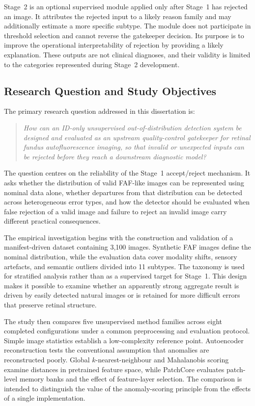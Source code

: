 \documentclass[fleqn,12pt]{olplainarticle}
\begin{document}
Stage~2 is an optional supervised module applied only after Stage~1 has
rejected an image. It attributes the rejected input to a likely reason family
and may additionally estimate a more specific subtype. The module does not
participate in threshold selection and cannot reverse the gatekeeper decision.
Its purpose is to improve the operational interpretability of rejection by
providing a likely explanation. These outputs are not clinical diagnoses, and
their validity is limited to the categories represented during Stage~2
development.

\subsection{Research Question and Study Objectives}
\label{sec:research_question}

The primary research question addressed in this dissertation is:

\begin{quote}
\emph{How can an ID-only unsupervised out-of-distribution detection system be designed and evaluated as an upstream quality-control gatekeeper for retinal fundus autofluorescence imaging, so that invalid or unexpected inputs can be rejected before they reach a downstream diagnostic model?}
\end{quote}

The question centres on the reliability of the Stage~1 accept/reject mechanism. It asks whether the distribution of valid FAF-like images can be represented using nominal data alone, whether departures from that distribution can be detected across heterogeneous error types, and how the detector should be evaluated when false rejection of a valid image and failure to reject an invalid image carry different practical consequences.

The empirical investigation begins with the construction and validation of a manifest-driven dataset containing 3,100 images. Synthetic FAF images define the nominal distribution, while the evaluation data cover modality shifts, sensory artefacts, and semantic outliers divided into 11 subtypes. The taxonomy is used for stratified analysis rather than as a supervised target for Stage~1. This design makes it possible to examine whether an apparently strong aggregate result is driven by easily detected natural images or is retained for more difficult errors that preserve retinal structure.

The study then compares five unsupervised method families across eight completed configurations under a common preprocessing and evaluation protocol. Simple image statistics establish a low-complexity reference point. Autoencoder reconstruction tests the conventional assumption that anomalies are reconstructed poorly. Global $k$-nearest-neighbour and Mahalanobis scoring examine distances in pretrained feature space, while PatchCore evaluates patch-level memory banks and the effect of feature-layer selection. The comparison is intended to distinguish the value of the anomaly-scoring principle from the effects of a single implementation.
\end{document}
